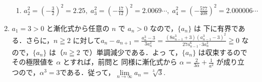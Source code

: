 \documentclass[11pt, uplatex, dvipdfmx, twoside]{jsarticle}
\renewcommand{\dlim}{\lim\limits} %
\begin{document}
\begin{enumerate}[label=\ref{sec:sequence}.\arabic*]
\begin{enumerate}[label=(\arabic*)]
  \item $a_2^2 = \left(-\frac{3}{2}\right)^2 =
    2.25, \; a_3^2 = \left(-\frac{17}{12}\right)^2 =2.0069\cdots, \;
    a_4^2=\left(-\frac{577}{408}\right)^2 =2.000006\cdots$ 
  \end{enumerate}
  
\item $a_1=3>0$ と漸化式から任意の $n$ で $a_n>0$ なので，$\{a_n\}$ は
  下に有界である．さらに，$n \geqq 2$
  に対して$a_n - a_{n+1} = \frac{a_n^3-3}{3a_n^2} =
  \frac{(8a_{n-1}^3+3)(a_{n-1}^3-3)^2}{27a_{n-1}^6 \cdot 3a_{n}^2}
  \geqq 0$ なので，$\{a_n\}$ は（$n\geqq 2$ で）単調減少である．よっ
  て，$\{a_n\}$ は収束するのでその極限値を $\alpha$ とすれば，前問と
  同様に漸化式から $\alpha = \frac{2}{3\alpha}+\frac{1}{a^2}$ が成り立
  つので，$\alpha^3=3$である．従って，$\dlim_{n \to \infty} a_n
  = \sqrt[3]{3}$.
\end{enumerate}
\end{document}

